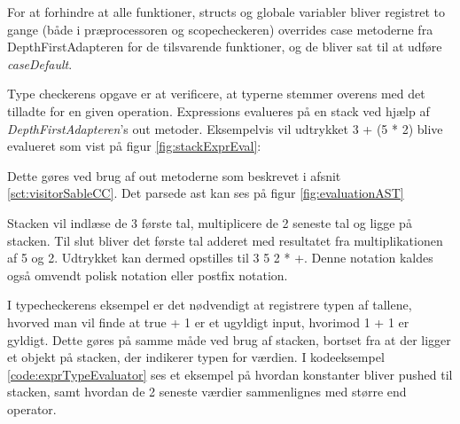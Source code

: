 \noindent For at forhindre at alle funktioner, structs og globale variabler bliver registret to gange (både i præprocessoren og scopecheckeren) overrides case metoderne fra DepthFirstAdapteren for de tilsvarende funktioner, og de bliver sat til at udføre \textit{caseDefault}.

Type checkerens opgave er at verificere, at typerne stemmer overens med det tilladte for en given operation. 
Expressions evalueres på en stack ved hjælp af \textit{DepthFirstAdapteren}'s out metoder. Eksempelvis vil udtrykket 3 + (5 * 2) blive evalueret som vist på figur \ref{fig:stackExprEval}:


\noindent Dette gøres ved brug af out metoderne som beskrevet i afsnit \ref{sct:visitorSableCC}. Det parsede \gls{ast} kan ses på figur \ref{fig:evaluationAST}

Stacken vil indlæse de 3 første tal, multiplicere de 2 seneste tal og ligge på stacken. Til slut bliver det første tal adderet med resultatet fra multiplikationen af 5 og 2. Udtrykket kan dermed opstilles til 3 5 2 * +. Denne notation kaldes også omvendt polisk notation \cite{CraftingCompiler_2009} eller postfix notation.

I typecheckerens eksempel er det nødvendigt at registrere typen af tallene, hvorved man vil finde at true + 1 er et ugyldigt input, hvorimod 1 + 1 er gyldigt. Dette gøres på samme måde ved brug af stacken, bortset fra at der ligger et objekt på stacken, der indikerer typen for værdien. I kodeeksempel \ref{code:exprTypeEvaluator} ses et eksempel på hvordan konstanter bliver pushed til stacken, samt hvordan de 2 seneste værdier sammenlignes med større end operator.  

